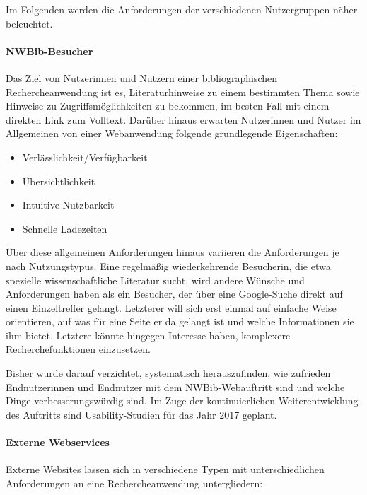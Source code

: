 \documentclass[a4paper,
fontsize=11pt,
oneside,
numbers=noperiodatend,
parskip=half-,
bibliography=totoc,
final
]{scrartcl}
\providecommand{\tightlist}{%
  \setlength{\itemsep}{0pt}\setlength{\parskip}{0pt}}
\begin{document}
Im Folgenden werden die Anforderungen der verschiedenen Nutzergruppen
näher beleuchtet.

\paragraph{NWBib-Besucher}\label{nwbib-besucher}

Das Ziel von Nutzerinnen und Nutzern einer bibliographischen
Rechercheanwendung ist es, Literaturhinweise zu einem bestimmten Thema
sowie Hinweise zu Zugriffsmöglichkeiten zu bekommen, im besten Fall mit
einem direkten Link zum Volltext. Darüber hinaus erwarten Nutzerinnen
und Nutzer im Allgemeinen von einer Webanwendung folgende grundlegende
Eigenschaften:

\begin{itemize}
\tightlist
\item
  Verlässlichkeit/Verfügbarkeit
\item
  Übersichtlichkeit
\item
  Intuitive Nutzbarkeit
\item
  Schnelle Ladezeiten
\end{itemize}

Über diese allgemeinen Anforderungen hinaus variieren die Anforderungen
je nach Nutzungstypus. Eine regelmäßig wiederkehrende Besucherin, die
etwa spezielle wissenschaftliche Literatur sucht, wird andere Wünsche
und Anforderungen haben als ein Besucher, der über eine Google-Suche
direkt auf einen Einzeltreffer gelangt. Letzterer will sich erst einmal
auf einfache Weise orientieren, auf was für eine Seite er da gelangt ist
und welche Informationen sie ihm bietet. Letztere könnte hingegen
Interesse haben, komplexere Recherchefunktionen einzusetzen.

Bisher wurde darauf verzichtet, systematisch herauszufinden, wie
zufrieden Endnutzerinnen und Endnutzer mit dem NWBib-Webauftritt sind
und welche Dinge verbesserungswürdig sind. Im Zuge der kontinuierlichen
Weiterentwicklung des Auftritts sind Usability-Studien für das Jahr 2017
geplant.

\paragraph{Externe Webservices}\label{externe-webservices}

Externe Websites lassen sich in verschiedene Typen mit unterschiedlichen
Anforderungen an eine Rechercheanwendung untergliedern:
\end{document}
